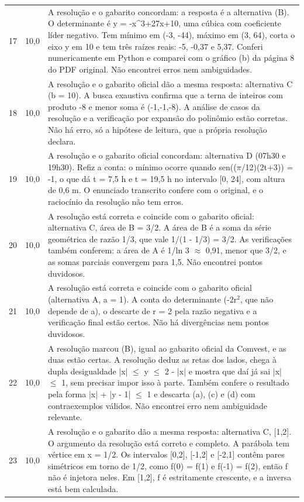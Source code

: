 \documentclass{article}%
\begin{document}
\begin{longtable}{@{}c c p{}@{}}
17 & 10,0 & A resolução e o gabarito concordam: a resposta é a alternativa (B). O determinante é y = {-}x\^{}3+27x+10, uma cúbica com coeficiente líder negativo. Tem mínimo em ({-}3, {-}44), máximo em (3, 64), corta o eixo y em 10 e tem três raízes reais: {-}5, {-}0,37 e 5,37. Conferi numericamente em Python e comparei com o gráfico (b) da página 8 do PDF original. Não encontrei erros nem ambiguidades. \\
18 & 10,0 & A resolução e o gabarito oficial dão a mesma resposta: alternativa C (b = 10). A busca exaustiva confirma que a terna de inteiros com produto {-}8 e menor soma é ({-}1,{-}1,{-}8). A análise de casos da resolução e a verificação por expansão do polinômio estão corretas. Não há erro, só a hipótese de leitura, que a própria resolução declara. \\
19 & 10,0 & A resolução e o gabarito oficial concordam: alternativa D (07h30 e 19h30). Refiz a conta: o mínimo ocorre quando sen(($\pi$/12)(2t+3)) = -1, o que dá t = 7,5 h e t = 19,5 h no intervalo {[}0, 24{]}, com altura de 0,6 m. O enunciado transcrito confere com o original, e o raciocínio da resolução não tem erros. \\
20 & 10,0 & A resolução está correta e coincide com o gabarito oficial: alternativa C, área de B = 3/2. A área de B é a soma da série geométrica de razão 1/3, que vale 1/(1 - 1/3) = 3/2. As verificações também conferem: a área de A é 1/ln 3 $\approx$ 0,91, menor que 3/2, e as somas parciais convergem para 1,5. Não encontrei pontos duvidosos. \\
21 & 10,0 & A resolução está correta e coincide com o gabarito oficial (alternativa A, a = 1). A conta do determinante (-2r$^2$, que não depende de a), o descarte de r = 2 pela razão negativa e a verificação final estão certos. Não há divergências nem pontos duvidosos. \\
22 & 10,0 & A resolução marcou (B), igual ao gabarito oficial da Comvest, e as duas estão certas. A resolução deduz as retas dos lados, chega à dupla desigualdade |x| $\leq$ y $\leq$ 2 - |x| e mostra que daí já sai |x| $\leq$ 1, sem precisar impor isso à parte. Também confere o resultado pela forma |x| + |y - 1| $\leq$ 1 e descarta (a), (c) e (d) com contraexemplos válidos. Não encontrei erro nem ambiguidade relevante. \\
23 & 10,0 & A resolução e o gabarito dão a mesma resposta: alternativa C, {[}1,2{]}. O argumento da resolução está correto e completo. A parábola tem vértice em x = 1/2. Os intervalos {[}0,2{]}, {[}-1,2{]} e {[}-2,1{]} contêm pares simétricos em torno de 1/2, como f(0) = f(1) e f(-1) = f(2), então f não é injetora neles. Em {[}1,2{]}, f é estritamente crescente, e a inversa está bem calculada. \\

\end{longtable}
\end{document}

